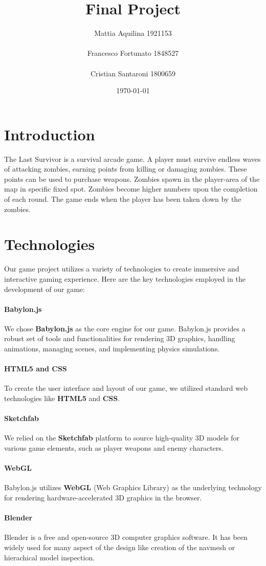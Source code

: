 \documentclass[12pt,a4paper,oneside]{article}
\title{Final Project}	                                    %
\author{Mattia Aquilina 1921153 \\\\ Francesco Fortunato 1848527    \\\\ Cristian Santaroni 1800659 }
\date{\today}									    %
\theoremstyle{definition}
\begin{document}


\tableofcontents
\newpage

\section{Introduction}

The Last Survivor is a survival arcade game. A player must survive endless waves of attacking zombies, earning points from killing or damaging zombies. These points can be used to purchase weapons. Zombies spawn in the player-area of the map in specific fixed spot.
Zombies become higher numbers upon the completion of each round.
The game ends when the player has been taken down by the zombies. 


\section{Technologies}
Our game project utilizes a variety of technologies to create immersive and interactive gaming experience. Here are the key technologies employed in the development of our game:
\paragraph{Babylon.js}
We chose \textbf{Babylon.js} as the core engine for our game. Babylon.js provides a robust set of tools and functionalities for rendering 3D graphics, handling animations, managing scenes, and implementing physics simulations. 
\paragraph{HTML5 and CSS}
To create the user interface and layout of our game, we utilized standard web technologies like \textbf{HTML5} and \textbf{CSS}. 
\paragraph{Sketchfab}
We relied on the \textbf{Sketchfab} platform to source high-quality 3D models for various game elements, such as player weapons and enemy characters.
\paragraph{WebGL}
Babylon.js utilizes \textbf{WebGL} (Web Graphics Library) as the underlying technology for rendering hardware-accelerated 3D graphics in the browser.
\paragraph{Blender} 
Blender is a free and open-source 3D computer graphics software. It has been widely used for many aspect of the design like creation of the navmesh or hierachical model inspection.
\end{document}
